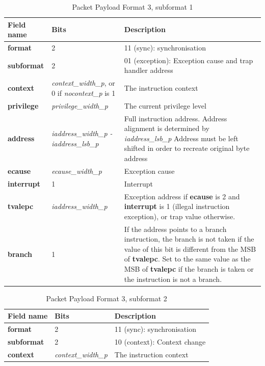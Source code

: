 \begin{table}[htp]
  \centering
  \caption{Packet Payload Format 3, subformat 1}
  \label{tab:te_inst3}
  \begin{tabulary}{\textwidth}{|l|p{35mm}|p{80mm}|}
    \hline
    {\bf Field name} & {\bf Bits} & {\bf Description} \\
    \hline
    \textbf{format} & 2 & 11 (sync): synchronisation\\
    \hline
    \textbf{subformat} & 2 & 01 (exception): Exception cause and trap handler address\\
    \hline
    \textbf{context} &  \textit {context\_width\_p}, 
               or 0 if \textit {nocontext\_p} is 1 & 
               The instruction context \\
    \hline
    \textbf{privilege} & \textit {privilege\_width\_p} & 
                The current privilege level \\
    \hline
    \textbf{address} & \textit {iaddress\_width\_p - iaddress\_lsb\_p} & 
              Full instruction address.  Address alignment is determined by \textit {iaddress\_lsb\_p} Address must be left shifted in order to recreate original byte address \\
    \hline
    \textbf{ecause} & \textit {ecause\_width\_p} & 
             Exception cause \\
    \hline
    \textbf{interrupt} & 1 & 
                Interrupt \\
    \hline
    \textbf{tvalepc} & \textit {iaddress\_width\_p} & 
           Exception address if \textbf{ecause} is 2 and \textbf{interrupt} is 1 (illegal instruction exception), or trap value otherwise.\\
    \hline
    \textbf{branch} & 1 & If the address points to a branch instruction, the branch is not taken if the value of this bit is different from the MSB of \textbf{tvalepc}. 
    Set to the same value as the MSB of \textbf{tvalepc} if the branch is taken or the instruction is not a branch. \\
    \hline
  \end{tabulary}
\end{table}

\begin{table}[htp]
  \centering
  \caption{Packet Payload Format 3, subformat 2}
  \label{tab:te_inst3}
  \begin{tabulary}{\textwidth}{|l|p{35mm}|p{80mm}|}
    \hline
    {\bf Field name} & {\bf Bits} & {\bf Description} \\
    \hline
    \textbf{format} & 2 & 11 (sync): synchronisation\\
    \hline
    \textbf{subformat}  & 2 & 10 (context): Context change \\
    \hline
    \textbf{context} &  \textit {context\_width\_p} & The instruction context \\
      \hline
  \end{tabulary}
\end{table}

